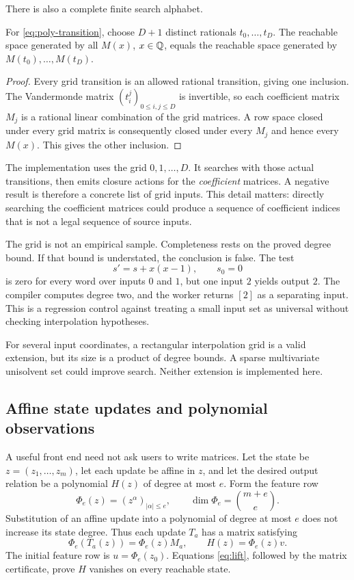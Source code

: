 There is also a complete finite search alphabet.

\begin{theorem}\label{thm:interp}
For \eqref{eq:poly-transition}, choose $D+1$ distinct rationals
$t_0,\ldots,t_D$. The reachable space generated by all $M(x)$, $x\in\mathbb Q$, equals
the reachable space generated by $M(t_0),\ldots,M(t_D)$.
\end{theorem}
\begin{proof}
Every grid transition is an allowed rational transition, giving one inclusion.
The Vandermonde matrix $(t_i^j)_{0\le i,j\le D}$ is invertible, so each
coefficient matrix $M_j$ is a rational linear combination of the grid matrices.
A row space closed under every grid matrix is consequently closed under every
$M_j$ and hence every $M(x)$. This gives the other inclusion.
\end{proof}

The implementation uses the grid $0,1,\ldots,D$. It searches with those actual
transitions, then emits closure actions for the \emph{coefficient} matrices.
A negative result is therefore a concrete list of grid inputs. This detail
matters: directly searching the coefficient matrices could produce a sequence
of coefficient indices that is not a legal sequence of source inputs.

The grid is not an empirical sample. Completeness rests on the proved degree
bound. If that bound is understated, the conclusion is false. The test
\[
s' = s+x(x-1),\qquad s_0=0
\]
is zero for every word over inputs $0$ and $1$, but one input $2$ yields output
$2$. The compiler computes degree two, and the worker returns $[2]$ as a
separating input. This is a regression control against treating a small input
set as universal without checking interpolation hypotheses.

For several input coordinates, a rectangular interpolation grid is a valid
extension, but its size is a product of degree bounds. A sparse multivariate
unisolvent set could improve search. Neither extension is implemented here.

\subsection{Affine state updates and polynomial observations}
\label{sec:lift}

A useful front end need not ask users to write matrices. Let the state be
$z=(z_1,\ldots,z_m)$, let each update be affine in $z$, and let the desired
output relation be a polynomial $H(z)$ of degree at most $e$. Form the feature
row
\[
\Phi_e(z)=(z^\alpha)_{|\alpha|\le e},\qquad
\dim\Phi_e=\binom{m+e}{e}.
\]
Substitution of an affine update into a polynomial of degree at most $e$ does
not increase its state degree. Thus each update $T_a$ has a matrix satisfying
\begin{equation}\label{eq:lift}
\Phi_e(T_a(z))=\Phi_e(z)M_a,
\qquad H(z)=\Phi_e(z)v.
\end{equation}
The initial feature row is $u=\Phi_e(z_0)$. Equations \eqref{eq:lift}, followed
by the matrix certificate, prove $H$ vanishes on every reachable state.

